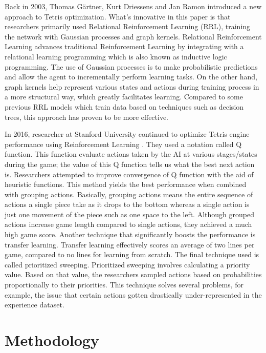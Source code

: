 \documentclass[letterpaper]{article} %
\begin{document}
Back in 2003, Thomas Gärtner, Kurt Driessens and Jan Ramon introduced a new approach to Tetris optimization\cite{s017}. What's innovative in this paper is that researchers primarily used Relational Reinforcement Learning (RRL), training the network with Gaussian processes and graph kernels. Relational Reinforcement Learning advances traditional Reinforcement Learning by integrating with a relational learning programming which is also known as inductive logic programming. The use of Gaussian processes is to make probabilistic predictions and allow the agent to incrementally perform learning tasks. On the other hand, graph kernels help represent various states and actions during training process in a more structural way, which greatly facilitates learning. Compared to some previous RRL models which train data based on techniques such as decision trees, this approach has proven to be more effective.

In 2016, researcher at Stanford University continued to optimize Tetris engine performance using Reinforcement Learning \cite{s016}. They used a notation called Q function. This function evaluate actions taken by the AI at various stages/states during the game; the value of this Q function tells us what the best next action is. Researchers attempted to improve convergence of Q function with the aid of heuristic functions. This method yields the best performance when combined with grouping actions. Basically, grouping actions means the entire sequence of actions a single piece take as it drops to the bottom whereas a single action is just one movement of the piece such as one space to the left. Although grouped actions increase game length compared to single actions, they achieved a much high game score. Another technique that significantly boosts the performance is transfer learning. Transfer learning effectively scores an average of two lines per game, compared to no lines for learning from scratch. The final technique used is called prioritized sweeping. Prioritized sweeping involves calculating a priority value. Based on that value, the researchers sampled actions based on probabilities proportionally to their priorities. This technique solves several problems, for example, the issue that certain actions gotten drastically under-represented in the experience dataset.


\section{Methodology}
\end{document}
